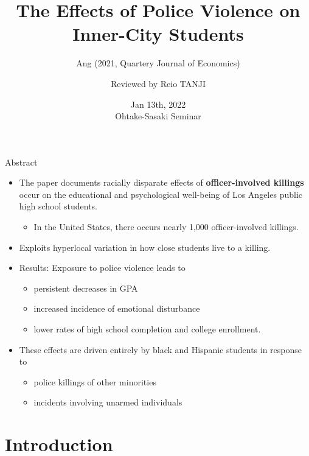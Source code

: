 \documentclass[dvipdfmx]{beamer}
\title[Ang (2021, QJE)]{The Effects of Police Violence on Inner-City Students}
\subtitle{Ang (2021, Quartery Journal of Economics)}
\author[Reviewed by R.TANJI]{Reviewed by Reio TANJI}
\date[Ohtake-Sasaki Seminar]{Jan 13th, 2022 \\ Ohtake-Sasaki Seminar}
\institute[]{Osaka University, Graduate School of Economics}
\begin{document}
\begin{frame}\frametitle{}
\titlepage
\end{frame}

\begin{frame}{Abstract}
  \begin{itemize}
    \item The paper documents racially disparate effects of \textbf{officer-involved killings} occur on the educational and psychological well-being of Los Angeles public high school students.
    \begin{itemize}
      \item In the United States, there occurs nearly 1,000 officer-involved killings.
    \end{itemize}
    \item Exploits hyperlocal variation in how close students live to a killing.
    \item Results: Exposure to police violence leads to
    \begin{itemize}
      \item persistent decreases in GPA
      \item increased incidence of emotional disturbance
      \item lower rates of high school completion and college enrollment.
    \end{itemize}
    \item These effects are driven entirely by black and Hispanic students in response to
    \begin{itemize}
      \item police killings of other minorities
      \item incidents involving unarmed individuals
    \end{itemize}
  \end{itemize}
\end{frame}

\section{Introduction}
\frame{\sectionpage}
\end{document}
